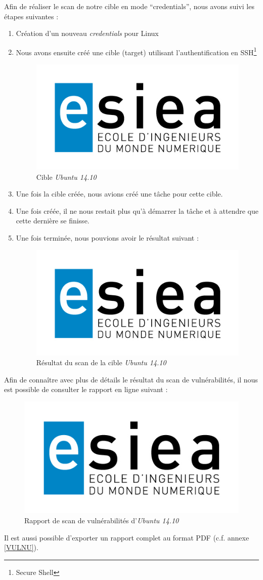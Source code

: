 Afin de réaliser le scan de notre cible en mode \enquote{credentials}, nous avons suivi les étapes suivantes :
\begin{enumerate}
 \item Création d'un nouveau \textit{credentials} pour Linux
 \item Nous avons ensuite créé une cible (target) utilisant l'authentification en SSH\footnote{Secure Shell\cite{SMB}}\\
 \begin{figure}[H]
    \centering
    \includegraphics[width=.7\textwidth]{img/esiea.jpeg}
    \caption{Cible \textit{Ubuntu 14.10}}
 \end{figure}
 \item Une fois la cible créée, nous avions créé une tâche pour cette cible.
 \item Une fois créée, il ne nous restait plus qu'à démarrer la tâche et à attendre que cette dernière se finisse.
 \item Une fois terminée, nous pouvions avoir le résultat suivant :
 \begin{figure}[H]
    \centering
    \includegraphics[width=.7\textwidth]{img/esiea.jpeg}
    \caption{Résultat du scan de la cible \textit{Ubuntu 14.10}}
 \end{figure}
\end{enumerate}
Afin de connaître avec plus de détails le résultat du scan de vulnérabilités, il nous est possible de consulter le rapport en ligne suivant :
\begin{figure}[H]
    \centering
    \includegraphics[width=.7\textwidth]{img/esiea.jpeg}
    \caption{Rapport de scan de vulnérabilités d'\textit{Ubuntu 14.10}}
\end{figure}
Il est aussi possible d'exporter un rapport complet au format PDF (c.f. annexe \ref{VULNU}).

